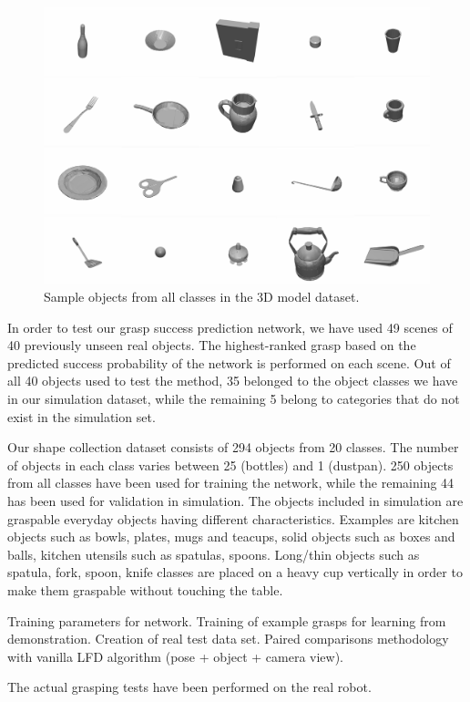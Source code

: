 \begin{figure}
  \includegraphics[width=\linewidth]{images/allObjects.pdf}
  \caption{Sample objects from all classes in the 3D model dataset.}
  \label{fig:allObjects}
\end{figure}

In order to test our grasp success prediction network, we have used 49 scenes of 40 previously unseen real objects. The highest-ranked grasp based on the predicted success probability of the network is performed on each scene. Out of all 40 objects used to test the method, 35 belonged to the object classes we have in our simulation dataset, while the remaining 5 belong to categories that do not exist in the simulation set. 

Our shape collection dataset consists of 294 objects from 20 classes. The number of objects in each class varies between 25 (bottles) and 1 (dustpan). 250 objects from all classes have been used for training the network, while the remaining 44 has been used for validation in simulation. The objects included in simulation are graspable everyday objects having different characteristics. Examples are kitchen objects such as bowls, plates, mugs and teacups, solid objects such as boxes and balls, kitchen utensils such as spatulas, spoons. Long/thin objects such as spatula, fork, spoon, knife classes are placed on a heavy cup vertically in order to make them graspable without touching the table. 

Training parameters for network. Training of example grasps for learning from demonstration. Creation of real test data set. Paired comparisons methodology with vanilla LFD algorithm (pose + object + camera view).

The actual grasping tests have been performed on the real robot. 